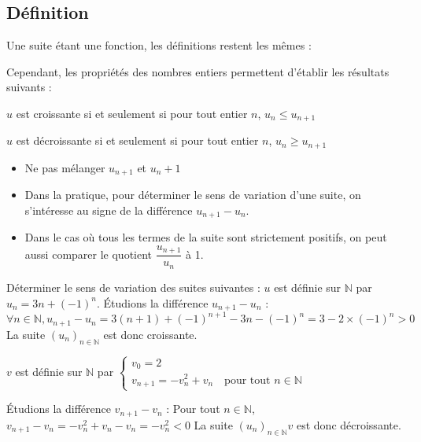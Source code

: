 \documentclass[french]{book}
\newcommand{\N}{\mathbb {N}}
\newcommand{\se}{\geq}
\newcommand{\ie}{\leq}
\newcommand{\suite}[1][u]{\left( #1_{n} \right)_{n\in\N}}
\begin{document}
\subsection{Définition}
Une suite étant une fonction, les définitions restent les mêmes :


Cependant, les propriétés des nombres entiers permettent d'établir les résultats suivants :

\begin{prop}
$u$ est croissante si et seulement si pour tout entier $n$, $u_{n}\ie u_{n+1}$
\par $u$ est décroissante si et seulement si pour tout entier $n$, $u_{n}\se u_{n+1}$
\end{prop}

\begin{rem}
\begin{itemize}
\item Ne pas mélanger $u_{n+1}$ et $u_{n}+1$
\item Dans la pratique, pour déterminer le sens de variation d'une suite, on s'intéresse au signe de la différence $u_{n+1}-u_{n}$.
\item Dans le cas où tous les termes de la suite sont strictement positifs, on peut aussi comparer le quotient $\dfrac{u_{n+1}}{u_{n}}$ à 1.
\end{itemize}
\end{rem}

\begin{exemple}
Déterminer le sens de variation des suites suivantes :
 $u$ est définie sur $\N$ par $u_{n}=3n+(-1)^{n}$.
 Étudions la différence $u_{n+1}-u_{n}$ :
 $$\forall n\in\N, u_{n+1}-u_{n}=3(n+1)+(-1)^{n+1}-3n-(-1)^{n}=3-2\times(-1)^{n}>0$$
 La suite $\suite[u]$ est donc croissante.
\end{exemple}

\begin{exemple}
$v$ est définie sur $\N$ par 
$\left\{\begin{array}{l}
v_0=2\\
v_{n+1}=-v_{n}^2+v_{n} \quad \text{pour tout } n\in\N
\end{array}\right.$

 Étudions la différence $v_{n+1}-v_{n}$ :
 Pour tout $n\in\N$, $v_{n+1}-v_{n}=-v_{n}^2+v_{n}-v_{n}=-v_{n}^2<0$
 La suite $\suite{v}$ est donc décroissante.
\end{exemple}
\end{document}
